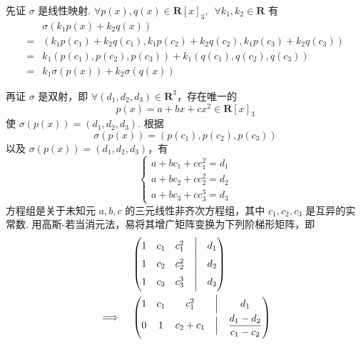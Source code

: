 \begin{exercise}
\begin{exgroup}
\begin{answer}
          先证 $ \sigma $ 是线性映射. $ \forall p(x), q(x) \in \mathbf{R}[x]_3,\enspace \forall k_1, k_2 \in \mathbf{R} $ 有
          \begin{align*}
                  & \sigma(k_1 p(x) + k_2 q(x))                                                 \\
              ={} & (k_1 p(c_1) + k_2 q(c_1), k_1 p(c_2) + k_2 q(c_2), k_1 p(c_3) + k_2 q(c_3)) \\
              ={} & k_1(p(c_1), p(c_2), p(c_3)) + k_1(q(c_1), q(c_2), q(c_3))                   \\
              ={} & k_1 \sigma(p(x)) + k_2 \sigma(q(x))
          \end{align*}

          再证 $ \sigma $ 是双射，即 $ \forall (d_1, d_2, d_3) \in \mathbf{R}^3 $，存在唯一的
          \[ p(x) = a + bx + cx^2 \in \mathbf{R}[x]_3 \]
          使 $ \sigma(p(x)) = (d_1, d_2, d_3) $. 根据
          \[ \sigma(p(x)) = (p(c_1), p(c_2), p(c_3)) \]
          以及 $ \sigma(p(x)) = (d_1, d_2, d_3) $，有
          \[ \begin{cases}
                  a + bc_1 + cc_1^2 = d_1 \\
                  a + bc_2 + cc_2^2 = d_2 \\
                  a + bc_3 + cc_3^3 = d_3
              \end{cases} \]
          方程组是关于未知元 $ a, b, c $ 的三元线性非齐次方程组，其中 $ c_1, c_2, c_3 $ 是互异的实常数. 用高斯-若当消元法，易将其增广矩阵变换为下列阶梯形矩阵，即
          \begin{align} %
                             & \begin{pmatrix}
                                   1 & c_1 & c_1^2 & \Bigm| & d_1 \\
                                   1 & c_2 & c_2^2 & \Bigm| & d_2 \\
                                   1 & c_3 & c_3^3 & \Bigm| & d_3
                               \end{pmatrix} \notag                                                                    \\
              \implies \quad & \begin{pmatrix}
                                   1 & c_1 & c_1^2     & \Bigm| & d_1                                                         \\[1ex]
                                   0 & 1   & c_2 + c_1 & \Bigm| & \dfrac{d_1 - d_2}{c_1 - c_2}                                \\[2ex]

\end{pmatrix}
\end{align}
\end{answer}
\end{exgroup}
\end{exercise}
